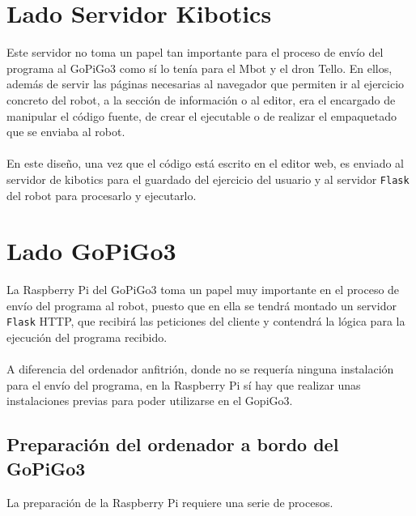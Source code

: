 \documentclass{report}
\begin{document}
\section{Lado Servidor Kibotics}

Este servidor no toma un papel tan importante para el proceso de envío del programa al GoPiGo3 como sí lo tenía para el Mbot y el dron Tello. En ellos, además de servir las páginas necesarias al navegador que permiten ir al ejercicio concreto del robot, a la sección de información o al editor, era el encargado de manipular el código fuente, de crear el ejecutable o de realizar el empaquetado que se enviaba al robot.
\\
\\
En este diseño, una vez que el código está escrito en el editor web, es enviado al servidor de kibotics para el guardado del ejercicio del usuario y al servidor \texttt{Flask} del robot para procesarlo y ejecutarlo. 

\section{Lado GoPiGo3}

La Raspberry Pi del GoPiGo3 toma un papel muy importante en el proceso de envío del programa al robot, puesto que en ella se tendrá montado un servidor \texttt{Flask} HTTP, que recibirá las peticiones del cliente y contendrá la lógica para la ejecución del programa recibido.
\\
\\
A diferencia del ordenador anfitrión, donde no se requería ninguna instalación para el envío del programa, en la Raspberry Pi sí hay que realizar unas instalaciones previas para poder utilizarse en el GopiGo3.

\subsection{Preparación del ordenador a bordo del GoPiGo3}

La preparación de la Raspberry Pi requiere una serie de procesos.
\end{document}
